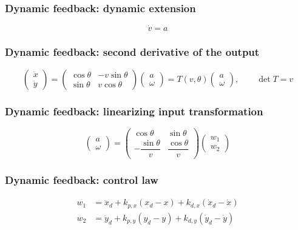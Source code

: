 \subsubsection{Dynamic feedback: dynamic extension}
\begin{equation*}
    \dot v=a
\end{equation*}

\subsubsection{Dynamic feedback: second derivative of the output}
\begin{equation*}
    \begin{pmatrix}\ddot x\\\ddot y\end{pmatrix}=\begin{pmatrix}\cos\theta&-v\sin\theta\\\sin\theta&v\cos\theta\end{pmatrix}\begin{pmatrix}a\\\omega\end{pmatrix}=T(v,\theta)\begin{pmatrix}a\\\omega\end{pmatrix},\qquad\det T=v
\end{equation*}

\subsubsection{Dynamic feedback: linearizing input transformation}
\begin{equation*}
    \begin{pmatrix}a\\\omega\end{pmatrix}=\begin{pmatrix}\cos\theta&\sin\theta\\-\dfrac{\sin\theta}{v}&\dfrac{\cos\theta}{v}\end{pmatrix}\begin{pmatrix}w_1\\w_2\end{pmatrix}
\end{equation*}

\subsubsection{Dynamic feedback: control law}
\begin{align*}
    w_1&=\ddot x_d+k_{p,x}(x_d-x)+k_{d,x}(\dot x_d-\dot x)\\
    w_2&=\ddot y_d+k_{p,y}(y_d-y)+k_{d,y}(\dot y_d-\dot y)
\end{align*}

